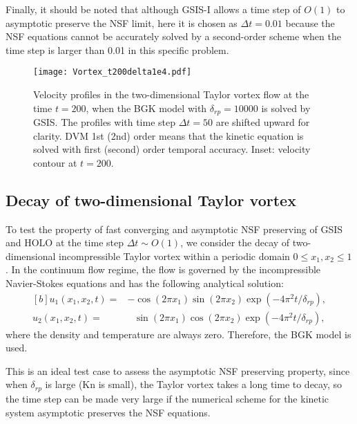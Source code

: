 \documentclass[onefignum,onetabnum]{siamart171218}
\begin{document}
Finally, it should be noted that although GSIS-I allows a time step of $O(1)$ to asymptotic preserve the NSF limit, here it is chosen as $\Delta{t}=0.01$ because the NSF equations cannot be accurately solved by a second-order scheme when the time step is larger than 0.01 in this specific problem. 


\begin{figure}[t]
	\centering
	\texttt{[image: Vortex\_t200delta1e4.pdf]}
	\caption{
		Velocity profiles in the two-dimensional Taylor vortex flow at the time $t=200$, when the BGK model with $\delta_{rp}=10000$ is solved by GSIS. The profiles with time step $\Delta{t}=50$ are shifted upward for clarity. DVM 1st (2nd) order means that the kinetic equation is solved with first (second) order temporal accuracy.  Inset: velocity contour at $t=200$.
	}
	\label{fig:Taylor}
\end{figure}

\subsection{Decay of two-dimensional Taylor vortex}\label{Taylor_vortex}


To test the property of fast converging and asymptotic NSF preserving of GSIS and HOLO at the time step $\Delta{t}\sim{O(1)}$, we consider the decay of  two-dimensional incompressible Taylor vortex within a periodic domain $0\le{x_1},x_2\le1$. In the continuum flow regime, the flow is governed by the incompressible Navier-Stokes equations and has the following analytical solution:
\begin{equation}
\begin{aligned}[b]
u_1(x_1,x_2,t)=&-\cos(2\pi{x_1})\sin(2\pi{x_2})\exp\left(-{4\pi^2}t/{\delta_{rp}}\right),\\
u_2(x_1,x_2,t)=&~~~\sin(2\pi{x_1})\cos(2\pi{x_2})\exp\left(-{4\pi^2}t/{\delta_{rp}}\right),
\end{aligned}
\end{equation}
where the density and temperature are always zero. Therefore, the BGK model is used.



This is an ideal test case to assess the asymptotic NSF preserving property, since when $\delta_{rp}$ is large ($\text{Kn}$ is small), the Taylor vortex takes a long time to decay, so the time step can be made very large if the numerical scheme for the kinetic system asymptotic preserves the NSF equations. 
\end{document}

